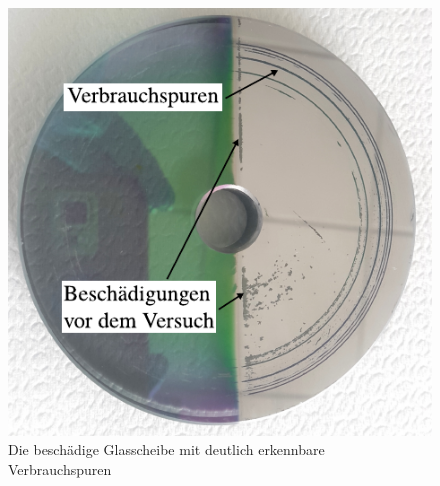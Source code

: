 \begin{figure}[htb]
    \centering
    \includegraphics[]{./images/beschaedige_scheibe.pdf}
    \caption{Die beschädige Glasscheibe mit deutlich erkennbare Verbrauchspuren}
    \label{fig:beschaedige_glasscheibe}
\end{figure}
